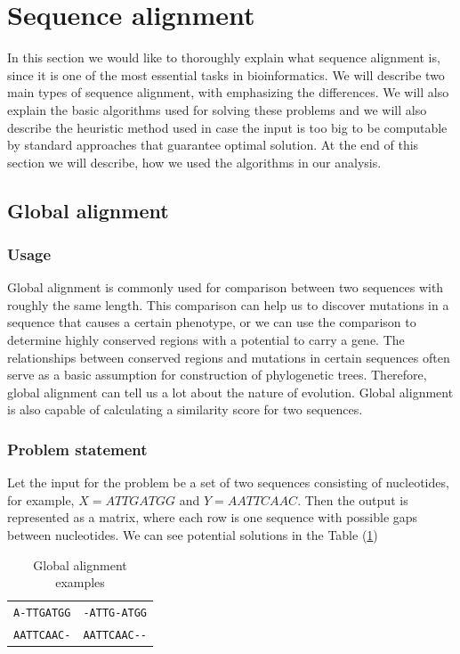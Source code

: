 \section{Sequence alignment}
In this section we would like to thoroughly explain what sequence alignment is, since it is one of the most essential tasks in bioinformatics.
We will describe two main types of sequence alignment, with emphasizing the differences.
We will also explain the basic algorithms used for solving these problems and we will also describe the heuristic method used in case the input is too big to be computable by standard approaches that guarantee optimal solution.
At the end of this section we will describe, how we used the algorithms in our analysis.

\subsection{Global alignment}
\subsubsection{Usage}
Global alignment is commonly used for comparison between two sequences with roughly the same length.
This comparison can help us to discover mutations in a sequence that causes a certain phenotype, or we can use the comparison to determine highly conserved regions with a potential to carry a gene.
The relationships between conserved regions and mutations in certain sequences often serve as a basic assumption for construction of phylogenetic trees.
Therefore, global alignment can tell us a lot about the nature of evolution.
Global alignment is also capable of calculating a similarity score for two sequences.

\subsubsection{Problem statement}
Let the input for the problem be a set of two sequences consisting of nucleotides, for example, $ X = ATTGATGG $ and $ Y = AATTCAAC $.
Then the output is represented as a matrix, where each row is one sequence with possible gaps between nucleotides.
We can see potential solutions in the Table (\ref{tab:potsol})

\begin{table}
  \centering
	\begin{tabular}{ l | r }
	\verb|A-TTGATGG| & \verb|-ATTG-ATGG| \\
	\verb|AATTCAAC-| & \verb|AATTCAAC--| \\
	\end{tabular}
  \caption{Global alignment examples}
  \label{tab:potsol}
\end{table}

